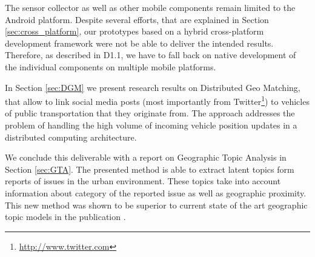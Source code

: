 \documentclass[external]{20120615_deliverable_template_ukob}
\theoremstyle{definition}
\begin{document}
\begin{LGExecutiveSummary}
The sensor collector as well as other mobile components remain limited
to the Android platform. Despite several efforts, that are explained
in Section \ref{sec:cross_platform}, our prototypes based on a hybrid
cross-platform development framework were not be able to deliver the
intended results. Therefore, as described in D1.1, we have to fall
back on native development of the individual components on multiple
mobile platforms. 

In Section \ref{sec:DGM} we present research results on Distributed Geo
Matching, that allow to link social media posts (most importantly from
Twitter\footnote{\url{http://www.twitter.com}}) to vehicles of public
transportation that they originate from. The approach addresses the
problem of handling the high volume of incoming vehicle position
updates in a distributed computing architecture.

We conclude this deliverable with a report on Geographic Topic
Analysis in Section \ref{sec:GTA}. The presented method is able to
extract latent topics form reports of issues in the urban environment.
These topics take into account information about category of the
reported issue as well as geographic proximity. This new method was
shown to be superior to current state of the art geographic topic
models in the publication \cite{CCK1}.

\end{LGExecutiveSummary}
\end{document}
